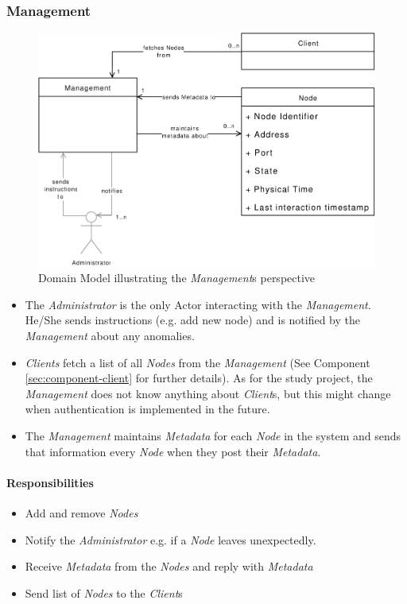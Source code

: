 \subsubsection{Management}

\begin{figure}[h]
    \centering
    \includegraphics[width=0.75\linewidth]{resources/management_domain_model}
    \caption[Management Domain Model]{Domain Model illustrating the \emph{Management}s perspective}
\end{figure}
\begin{itemize}
    \item The \emph{Administrator} is the only Actor interacting with the \emph{Management}. He/She sends instructions (e.g. add new node) and is notified by the \emph{Management} about any anomalies.
    \item \emph{Clients} fetch a list of all \emph{Nodes} from the \emph{Management} (See Component \ref{sec:component-client}  for further details). As for the study project, the \emph{Management} does not know anything about \emph{Client}s, but this might change when authentication is implemented in the future.
    \item The \emph{Management} maintains \emph{Metadata} for each \emph{Node} in the system and sends that information every \emph{Node} when they post their \emph{Metadata}.
\end{itemize}

\paragraph{Responsibilities}
\begin{itemize}
    \item Add and remove \emph{Nodes}
    \item Notify the \emph{Administrator} e.g. if a \emph{Node} leaves unexpectedly.
    \item Receive \emph{Metadata} from the \emph{Nodes} and reply with \emph{Metadata}
    \item Send list of \emph{Nodes} to the \emph{Client}s
\end{itemize}

